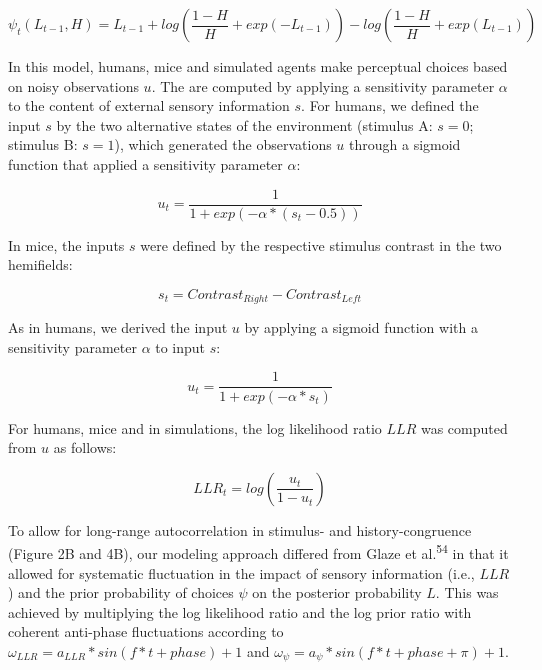 \documentclass[
]{article}
\begin{document}
\begin{equation}
\psi_t(L_{t-1}, H)  = L_{t-1} + log(\frac{1-H}{H} + exp(-L_{t-1})) - log(\frac{1-H}{H} + exp(L_{t-1}))
\end{equation}

In this model, humans, mice and simulated agents make perceptual choices
based on noisy observations \(u\). The are computed by applying a
sensitivity parameter \(\alpha\) to the content of external sensory
information \(s\). For humans, we defined the input \(s\) by the two
alternative states of the environment (stimulus A: \(s = 0\); stimulus
B: \(s = 1\)), which generated the observations \(u\) through a sigmoid
function that applied a sensitivity parameter \(\alpha\):

\begin{equation}
u_t = \frac{1}{1+exp(-\alpha*(s_t-0.5))}
\end{equation}

In mice, the inputs \(s\) were defined by the respective stimulus
contrast in the two hemifields:

\begin{equation}
s_t = Contrast_{Right} - Contrast_{Left}
\end{equation}

As in humans, we derived the input \(u\) by applying a sigmoid function
with a sensitivity parameter \(\alpha\) to input \(s\):

\begin{equation}
u_t = \frac{1}{1 + exp(-\alpha * s_t)}
\end{equation}

For humans, mice and in simulations, the log likelihood ratio \(LLR\)
was computed from \(u\) as follows:

\begin{equation}
LLR_t = log(\frac{u_t}{1-u_t})
\end{equation}

To allow for long-range autocorrelation in stimulus- and
history-congruence (Figure 2B and 4B), our modeling approach differed
from Glaze et al.\textsuperscript{54} in that it allowed for systematic
fluctuation in the impact of sensory information (i.e., \(LLR\)) and the
prior probability of choices \(\psi\) on the posterior probability
\(L\). This was achieved by multiplying the log likelihood ratio and the
log prior ratio with coherent anti-phase fluctuations according to
\(\omega_{LLR} = a_{LLR} * sin(f * t + phase) + 1\) and
\(\omega_{\psi} = a_{\psi} * sin(f * t + phase + \pi) + 1\).
\end{document}
